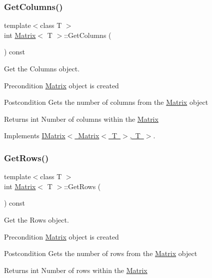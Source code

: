 \subsubsection{\texorpdfstring{GetColumns()}{GetColumns()}}
{\footnotesize\ttfamily template$<$class T $>$ \\
int \mbox{\hyperlink{class_matrix}{Matrix}}$<$ T $>$\+::Get\+Columns (\begin{DoxyParamCaption}{ }\end{DoxyParamCaption}) const\hspace{0.3cm}{\ttfamily [virtual]}}



Get the Columns object. 

\begin{DoxyPrecond}{Precondition}
\mbox{\hyperlink{class_matrix}{Matrix}} object is created 
\end{DoxyPrecond}
\begin{DoxyPostcond}{Postcondition}
Gets the number of columns from the \mbox{\hyperlink{class_matrix}{Matrix}} object 
\end{DoxyPostcond}
\begin{DoxyReturn}{Returns}
int Number of columns within the \mbox{\hyperlink{class_matrix}{Matrix}} 
\end{DoxyReturn}


Implements \mbox{\hyperlink{class_i_matrix_a3b84da3898ef38bdf281c13f218fc278}{I\+Matrix$<$ Matrix$<$ T $>$, T $>$}}.

\mbox{\label{class_matrix_aa665db4bc173a7bb4ec3f9da2676dfa6}} 
\subsubsection{\texorpdfstring{GetRows()}{GetRows()}}
{\footnotesize\ttfamily template$<$class T $>$ \\
int \mbox{\hyperlink{class_matrix}{Matrix}}$<$ T $>$\+::Get\+Rows (\begin{DoxyParamCaption}{ }\end{DoxyParamCaption}) const\hspace{0.3cm}{\ttfamily [virtual]}}



Get the Rows object. 

\begin{DoxyPrecond}{Precondition}
\mbox{\hyperlink{class_matrix}{Matrix}} object is created 
\end{DoxyPrecond}
\begin{DoxyPostcond}{Postcondition}
Gets the number of rows from the \mbox{\hyperlink{class_matrix}{Matrix}} object 
\end{DoxyPostcond}
\begin{DoxyReturn}{Returns}
int Number of rows within the \mbox{\hyperlink{class_matrix}{Matrix}} 
\end{DoxyReturn}


